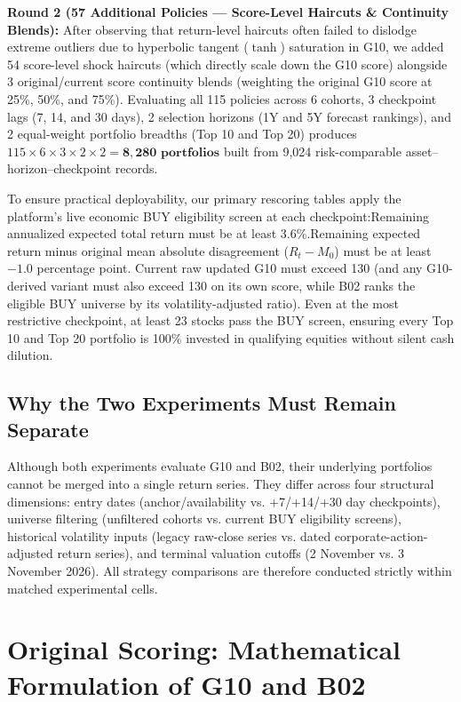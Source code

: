 \documentclass[11pt,a4paper]{article}
\numberwithin{table}{section}
\begin{document}
\textbf{Round 2 (57 Additional Policies --- Score-Level Haircuts \& Continuity Blends):}  After observing that return-level haircuts often failed to dislodge extreme outliers due to hyperbolic tangent ($\tanh$) saturation in G10, we added 54 score-level shock haircuts (which directly scale down the G10 score) alongside 3 original/current score continuity blends (weighting the original G10 score at 25\%, 50\%, and 75\%). Evaluating all 115 policies across 6 cohorts, 3 checkpoint lags (7, 14, and 30 days), 2 selection horizons (1Y and 5Y forecast rankings), and 2 equal-weight portfolio breadths (Top 10 and Top 20) produces $115 \times 6 \times 3 \times 2 \times 2 = \mathbf{8,280\text{ portfolios}}$ built from 9,024 risk-comparable asset--horizon--checkpoint records.

To ensure practical deployability, our primary rescoring tables apply the platform's live economic BUY eligibility screen at each checkpoint:Remaining annualized expected total return must be at least 3.6\%.Remaining expected return minus original mean absolute disagreement ($R_t - M_0$) must be at least $-1.0$ percentage point. Current raw updated G10 must exceed 130 (and any G10-derived variant must also exceed 130 on its own score, while B02 ranks the eligible BUY universe by its volatility-adjusted ratio). Even at the most restrictive checkpoint, at least 23 stocks pass the BUY screen, ensuring every Top 10 and Top 20 portfolio is 100\% invested in qualifying equities without silent cash dilution.

\subsection{Why the Two Experiments Must Remain Separate}

Although both experiments evaluate G10 and B02, their underlying portfolios cannot be merged into a single return series. They differ across four structural dimensions: entry dates (anchor/availability vs. +7/+14/+30 day checkpoints), universe filtering (unfiltered cohorts vs. current BUY eligibility screens), historical volatility inputs (legacy raw-close series vs. dated corporate-action-adjusted return series), and terminal valuation cutoffs (2 November vs. 3 November 2026). All strategy comparisons are therefore conducted strictly within matched experimental cells.

\section{Original Scoring: Mathematical Formulation of G10 and B02}
\end{document}

